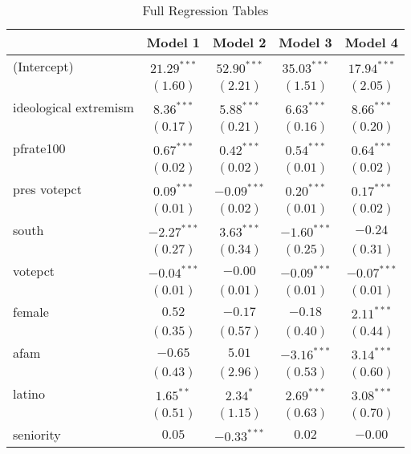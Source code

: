 \documentclass[12pt]{article}
\begin{document}
\begin{table}[ht]
	\begin{center}
		\caption{Full Regression Tables}
		\begin{tabular}{l c c c c }
			\hline
			& Model 1 & Model 2 & Model 3 & Model 4 \\
			\hline
			(Intercept)            & $21.29^{***}$ & $52.90^{***}$ & $35.03^{***}$ & $17.94^{***}$ \\
			& $(1.60)$      & $(2.21)$      & $(1.51)$      & $(2.05)$      \\
			ideological extremism & $8.36^{***}$  & $5.88^{***}$  & $6.63^{***}$  & $8.66^{***}$  \\
			& $(0.17)$      & $(0.21)$      & $(0.16)$      & $(0.20)$      \\
			pfrate100              & $0.67^{***}$  & $0.42^{***}$  & $0.54^{***}$  & $0.64^{***}$  \\
			& $(0.02)$      & $(0.02)$      & $(0.01)$      & $(0.02)$      \\
			pres votepct          & $0.09^{***}$  & $-0.09^{***}$ & $0.20^{***}$  & $0.17^{***}$  \\
			& $(0.01)$      & $(0.02)$      & $(0.01)$      & $(0.02)$      \\
			south                  & $-2.27^{***}$ & $3.63^{***}$  & $-1.60^{***}$ & $-0.24$       \\
			& $(0.27)$      & $(0.34)$      & $(0.25)$      & $(0.31)$      \\
			votepct                & $-0.04^{***}$ & $-0.00$       & $-0.09^{***}$ & $-0.07^{***}$ \\
			& $(0.01)$      & $(0.01)$      & $(0.01)$      & $(0.01)$      \\
			female                 & $0.52$        & $-0.17$       & $-0.18$       & $2.11^{***}$  \\
			& $(0.35)$      & $(0.57)$      & $(0.40)$      & $(0.44)$      \\
			afam                   & $-0.65$       & $5.01$        & $-3.16^{***}$ & $3.14^{***}$  \\
			& $(0.43)$      & $(2.96)$      & $(0.53)$      & $(0.60)$      \\
			latino                 & $1.65^{**}$   & $2.34^{*}$    & $2.69^{***}$  & $3.08^{***}$  \\
			& $(0.51)$      & $(1.15)$      & $(0.63)$      & $(0.70)$      \\
			seniority              & $0.05$        & $-0.33^{***}$ & $0.02$        & $-0.00$       \\

\end{tabular}
\end{center}
\end{table}
\end{document}
